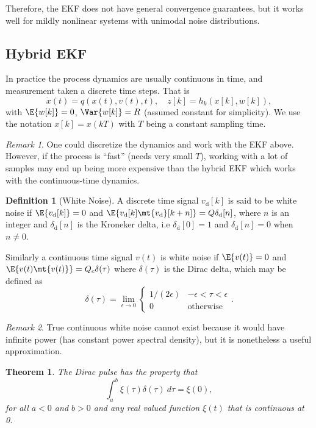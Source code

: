 \documentclass[]{hsrzf}
\theoremstyle{plain}
\newtheorem{thm}{Theorem}[section]
\theoremstyle{definition}
\newtheorem{defn}{Definition}[section]
\theoremstyle{remark}
\newtheorem*{remark}{Remark}
\begin{document}
Therefore, the EKF does not have general convergence guarantees, but it works
well for mildly nonlinear systems with unimodal noise distributions.

\subsection{Hybrid EKF}

In practice the process dynamics are usually continuous in time, and
measurement taken a discrete time steps. That is
\[
  \dot{x}(t) = q(x(t), v(t), t),
  \quad z[k] = h_k(x[k], w[k]),
\]
with $\E{w[k]} = 0$, $\Var{w[k]} = R$ (assumed constant for simplicity). We
use the notation $x[k] = x(kT)$ with $T$ being a constant sampling time.

\ifexamprint\else
\begin{remark}
  One could discretize the dynamics and work with the EKF above. However, if
  the process is ``fast'' (needs very small $T$), working with a lot of
  samples may end up being more expensive than the hybrid EKF which works with
  the continuous-time dynamics.
\end{remark}
\fi

\begin{defn}[White Noise]
  A discrete time signal $v_\mathrm{d}[k]$ is said to be white noise if
  $\E{v_\mathrm{d}[k]} = 0$ and \allowbreak$\E{v_\mathrm{d}[k]
  \mt{v_\mathrm{d}}[k+n]} = Q\delta_\mathrm{d}[n]$, where $n$ is an integer
  and $\delta_\mathrm{d}[n]$ is the Kroneker delta, i.e $\delta_\mathrm{d}[0]
  = 1$ and $\delta_\mathrm{d}[n] = 0$ when $n \neq 0$.

  Similarly a continuous time signal $v(t)$ is white noise if $\E{v(t)} = 0$
  and $\E{v(t) \mt{v(t)}} = Q_c \delta(\tau)$ where $\delta(\tau)$ is the
  Dirac delta, which may be defined as
  \[
    \delta(\tau) = \lim_{\epsilon \to 0} \begin{cases}
      1/(2\epsilon) & -\epsilon < \tau < \epsilon \\
      0 & \text{otherwise}
    \end{cases}.
  \]
\end{defn}

\begin{remark}
  True continuous white noise cannot exist because it would have infinite
  power (has constant power spectral density), but it is nonetheless a useful
  approximation.
\end{remark}

\begin{thm}
  The Dirac pulse has the property that
  \[
    \int_a^b \xi(\tau) \delta(\tau) ~d\tau = \xi(0),
  \]
  for all $a < 0$ and $b > 0$ and any real valued function $\xi(t)$ that is
  continuous at 0.
\end{thm}
\end{document}
